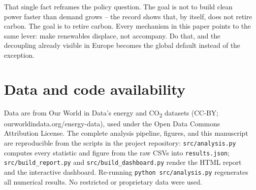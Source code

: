 \documentclass[11pt]{article}
\begin{document}
That single fact reframes the policy question. The goal is not to build clean power faster than demand grows -- the record shows that, by itself, does not retire carbon. The goal is to retire carbon. Every mechanism in this paper points to the same lever: make renewables displace, not accompany. Do that, and the decoupling already visible in Europe becomes the global default instead of the exception.

\section*{Data and code availability}
Data are from Our World in Data's energy and CO\textsubscript{2} datasets (CC-BY; ourworldindata.org/energy-data), used under the Open Data Commons Attribution License. The complete analysis pipeline, figures, and this manuscript are reproducible from the scripts in the project repository: \texttt{src/analysis.py} computes every statistic and figure from the raw CSVs into \texttt{results.json}; \texttt{src/build\_report.py} and \texttt{src/build\_dashboard.py} render the HTML report and the interactive dashboard. Re-running \texttt{python src/analysis.py} regenerates all numerical results. No restricted or proprietary data were used.
\end{document}
